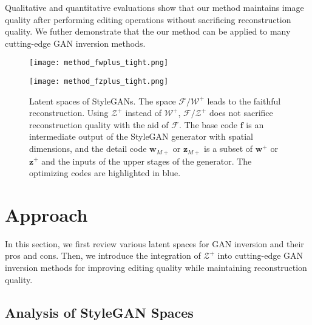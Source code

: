 \documentclass[10pt,twocolumn,letterpaper]{article}
\newcommand{\zpls}{\bm{z}^{+}}
\newcommand{\zmpls}{\bm{z}_{M+}}
\newcommand{\f}{\bm{f}}
\newcommand{\wpls}{\bm{w}^{+}}
\newcommand{\wmpls}{\bm{w}_{M+}}
\newcommand{\FWS}{\mathcal{F}/\mathcal{W}^{+}}
\newcommand{\WPS}{\mathcal{W}^{+}}
\newcommand{\ZPS}{\mathcal{Z}^{+}}
\newcommand{\FZS}{\mathcal{F}/\mathcal{Z}^{+}}
\newcommand{\FS}{\mathcal{F}}
\begin{document}
Qualitative and quantitative evaluations show that our method maintains image quality after performing editing operations without sacrificing reconstruction quality.
We futher demonstrate that the our method can be applied to many cutting-edge GAN inversion methods.

 \begin{figure}[tb]
   \centering
   \begin{minipage}{0.38\linewidth}
      \texttt{[image: method\_fwplus\_tight.png]}
   \end{minipage}%
   \hfill
   \begin{minipage}{0.62\linewidth}
      \texttt{[image: method\_fzplus\_tight.png]}
   \end{minipage}%
\vspace{-0.4em}
   \caption{Latent spaces of StyleGANs. The space $\FWS$
     leads to the faithful reconstruction. Using $\ZPS$ instead of $\WPS$, $\FZS$ does not sacrifice reconstruction quality with the aid of $\FS$.
    The base code $\f$ is an intermediate output of the StyleGAN generator with spatial dimensions, and 
    the detail code $\wmpls$ or $\zmpls$ is a subset of
    $\wpls$ or $\zpls$ and the inputs of the upper stages of the generator. The optimizing codes are highlighted in blue. \vspace{-1em}}
\end{figure}



\section{Approach}\label{sec:method}

In this section, we first review various latent spaces for GAN inversion
and their pros and cons.
Then, we introduce the integration of $\ZPS$ into cutting-edge GAN inversion methods for improving editing quality while maintaining reconstruction quality.

\subsection{Analysis of StyleGAN Spaces}\label{sec:fzspace}
\end{document}

